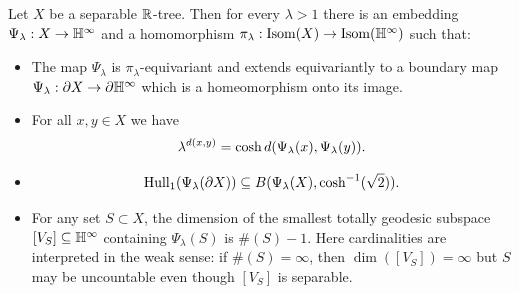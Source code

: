 \begin{theorem}
\label{theoremBIM}
Let $X$ be a separable $\R$-tree. Then for every $\lambda > 1$ there is an embedding $\Psi_\lambda:X\to\H^\infty$ and a homomorphism $\pi_\lambda : \Isom(X)\to \Isom(\H^\infty)$ such that:
\begin{itemize}
\item[(i)] The map $\Psi_\lambda$ is $\pi_\lambda$-equivariant and extends equivariantly to a boundary map $\Psi_\lambda:\del X\to \del\H^\infty$ which is a homeomorphism onto its image.
\item[(ii)] For all $x,y\in X$ we have
\begin{equation}
\label{BIM1}
\lambda^{d(x,y)} = \cosh d(\Psi_\lambda(x),\Psi_\lambda(y)).
\end{equation}
\item[(iii)]
\begin{equation}
\label{BIM2}
\operatorname{Hull}_1(\Psi_\lambda(\partial X)) \subseteq B(\Psi_\lambda(X),\cosh^{-1}(\sqrt 2)).
\end{equation}
\item[(iv)] For any set $S\subset X$, the dimension of the smallest totally geodesic subspace $[V_S]\subset\H^\infty$ containing $\Psi_\lambda(S)$ is $\#(S) - 1$. Here cardinalities are interpreted in the weak sense: if $\#(S) = \infty$, then $\dim([V_S]) = \infty$ but $S$ may be uncountable even though $[V_S]$ is separable.
\end{itemize}
\end{theorem}
